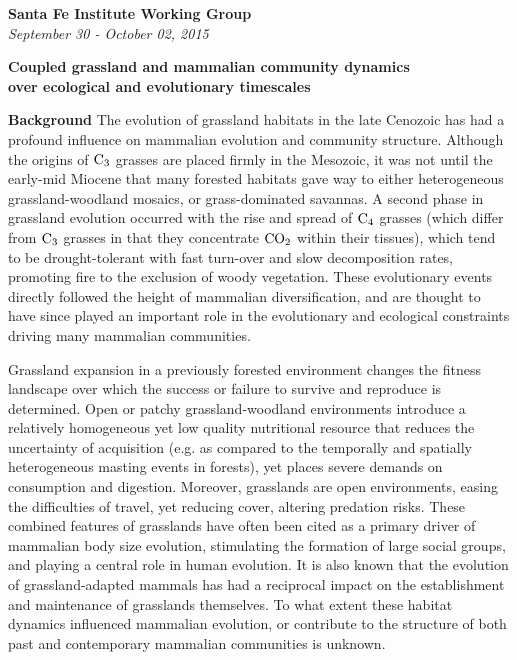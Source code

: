 \documentclass[sfi,11pt,foldmarks=off,backaddress=false,letterpaper]{scrlttr2}
\newenvironment{tightcenter}{%
  \setlength\topsep{0pt}
  \setlength\parskip{0pt}
  \begin{center}
}{%
  \end{center}
}
\begin{document}
\begin{letter}{{\bfseries Santa Fe Institute Working Group}\\ {\itshape September 30 - October 02, 2015} }

\opening{}

\begin{tightcenter}
{\bfseries Coupled grassland and mammalian community dynamics \\ over ecological and evolutionary timescales}
\end{tightcenter}
\vspace{10pt}

{\bfseries Background} The evolution of grassland habitats in the late Cenozoic has had a profound influence on mammalian evolution and community structure. Although the origins of ${\rm C_3}$ grasses are placed firmly in the Mesozoic, it was not until the early-mid Miocene that many forested habitats gave way to either heterogeneous grassland-woodland mosaics, or grass-dominated savannas. A second phase in grassland evolution occurred with the rise and spread of ${\rm C_4}$ grasses (which differ from ${\rm C_3}$ grasses in that they concentrate ${\rm CO_2}$ within their tissues), which tend to be drought-tolerant with fast turn-over and slow decomposition rates, promoting fire to the exclusion of woody vegetation. These evolutionary events directly followed the height of mammalian diversification, and are thought to have since played an important role in the evolutionary and ecological constraints driving many mammalian communities.

Grassland expansion in a previously forested environment changes the fitness landscape over which the success or failure to survive and reproduce is determined. Open or patchy grassland-woodland environments introduce a relatively homogeneous yet low quality nutritional resource that reduces the uncertainty of acquisition (e.g. as compared to the temporally and spatially heterogeneous masting events in forests), yet places severe demands on consumption and digestion. Moreover, grasslands are open environments, easing the difficulties of travel, yet reducing cover, altering predation risks. These combined features of grasslands have often been cited as a primary driver of mammalian body size evolution, stimulating the formation of large social groups, and playing a central role in human evolution. It is also known that the evolution of grassland-adapted mammals has had a reciprocal impact on the establishment and maintenance of grasslands themselves. To what extent these habitat dynamics influenced mammalian evolution, or contribute to the structure of both past and contemporary mammalian communities is unknown.


\end{letter}
\end{document}
